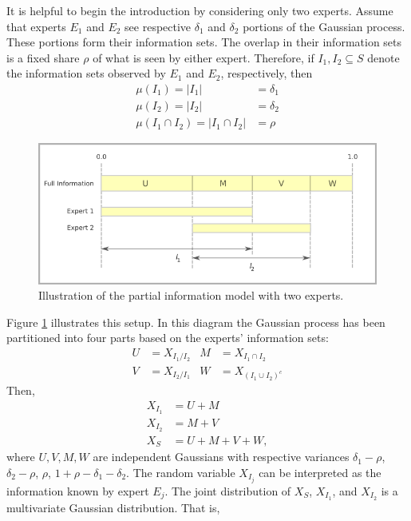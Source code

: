 \documentclass[11pt]{article}
\theoremstyle{definition}
\theoremstyle{definition}
\begin{document}
It is helpful to begin the introduction by considering only two experts. Assume that experts $E_1$ and $E_2$ see respective $\delta_1$ and $\delta_2$ portions of the Gaussian process. These portions form their information sets. The overlap in their information sets is a fixed share $\rho$ of what is seen by either expert. Therefore, if $I_1, I_2 \subseteq S$ denote the information sets observed by $E_1$ and $E_2$, respectively, then
\begin{align*}
\mu(I_1) = |I_1| &= \delta_1\\
\mu(I_2) = |I_2| &= \delta_2\\
\mu(I_1 \cap I_2) =  |I_1 \cap I_2| &= \rho
\end{align*}
\begin{figure}[htbp]
   \includegraphics[width = \textwidth]{N=2} %
   \caption{Illustration of the partial information model with two experts.}
   \label{diagram2}
\end{figure}
Figure \ref{diagram2} illustrates this setup. In this diagram the Gaussian process has been partitioned into four parts based on the experts' information sets:
\begin{align*}
 U &= X_{I_1 / I_2}
& M &= X_{I_1 \cap I_2}\\
 V &= X_{I_2 / I_1}
& W &= X_{(I_1 \cup I_2)^c}
\end{align*}
Then,
\begin{align*}
X_{I_1} &= U + M\\
X_{I_2} &= M + V\\
X_S &= U+M+V+W,
\end{align*}
where $U, V, M, W$ are independent Gaussians with respective variances $\delta_1-\rho$, $\delta_2-\rho$, $\rho$, $1+\rho-\delta_1 - \delta_2$. The random variable $X_{I_j}$ can be interpreted as the information known by expert $E_j$. The joint distribution of $X_{S}$, $X_{I_1}$, and $X_{I_2}$ is a multivariate Gaussian distribution. That is,
\end{document}
